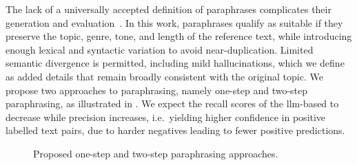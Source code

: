 The lack of a universally accepted definition of paraphrases complicates their generation and evaluation~\citep{gohsen_task_oriented_2024}. 
In this work, paraphrases qualify as suitable \imps{} if they preserve the topic, genre, tone, and length of the reference text, while introducing enough lexical and syntactic variation to avoid near-duplication. 
Limited semantic divergence is permitted, including mild hallucinations, which we define as added details that remain broadly consistent with the original topic.
We propose two approaches to paraphrasing, namely one-step and two-step paraphrasing, as illustrated in .
We expect the recall scores of the \ac{llm}-based \impAppr{} to decrease while precision increases, i.e.\ yielding higher confidence in positive labelled text pairs, due to harder negatives leading to fewer positive predictions.

\begin{figure}[h]
    \centering
    \caption[Different paraphrasing approaches]{Proposed one-step and two-step paraphrasing approaches.}
    \label{fig:paraphrasing_approaches}
\end{figure}

